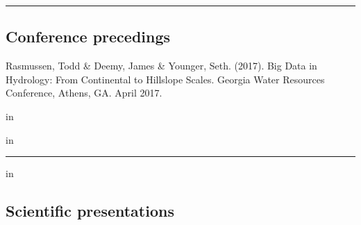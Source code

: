 \documentclass[10pt,letterpaper]{article}
\begin{document}
\hrule
\vspace{-0.4em}
\vskip 0.2in
\subsection*{Conference precedings}

\begin{hangparas}{.25in}{1}
	
	Rasmussen, Todd \& Deemy, James \& Younger, Seth. (2017). Big Data in Hydrology: From Continental to Hillslope Scales. Georgia Water Resources Conference, Athens, GA. April 2017.
	
 in

\end{hangparas}

 in

\hrule
\vspace{-0.4em}
 in
\subsection*{Scientific presentations}
\end{document}
